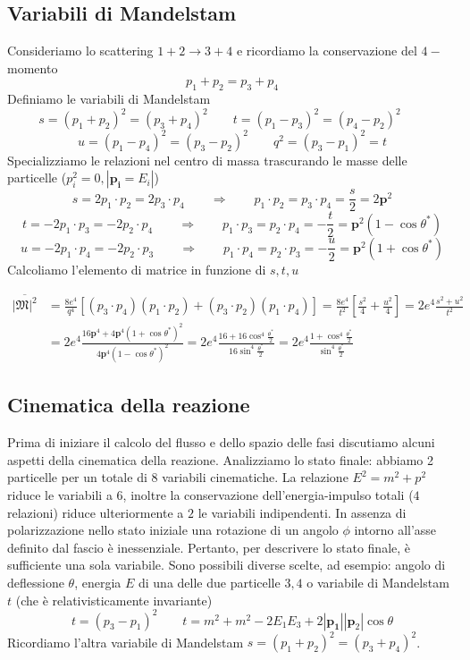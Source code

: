 \subsection{Variabili di Mandelstam}
Consideriamo lo scattering $1+2\to3+4$ e ricordiamo la conservazione del $4-$momento
$$
p_1+p_2=p_3+p_4
$$
Definiamo le variabili di Mandelstam
$$
s = (p_1 + p_2)^2 = (p_3 + p_4)^2 \qquad t = (p_1 - p_3)^2 = (p_4 - p_2)^2 \qquad 
$$
$$
u = (p_1 - p_4)^2 = (p_3 - p_2)^2 \qquad q^2 = (p_3 - p_1)^2 = t
$$
Specializziamo le relazioni nel centro di massa trascurando le masse delle particelle ($p^2_i=0, |\mathbf{p_i}=E_i|$)
$$
s = 2p_1 \cdot p_2 = 2p_3 \cdot p_4 \qquad \Longrightarrow\qquad  p_1 \cdot p_2 = p_3 \cdot p_4 = \frac{s}{2} = 2\mathbf{p}^2
$$
$$
t = -2p_1 \cdot p_3 = -2p_2 \cdot p_4 \qquad \Longrightarrow\qquad p_1 \cdot p_3 = p_2 \cdot p_4 = -\frac{t}{2} = \mathbf{p}^2 (1 - \cos\theta^*)
$$
$$
u = -2p_1 \cdot p_4 = -2p_2 \cdot p_3 \qquad \Longrightarrow\qquad p_1 \cdot p_4 = p_2 \cdot p_3 = -\frac{u}{2} = \mathbf{p}^2 (1 + \cos\theta^*)
$$
Calcoliamo l'elemento di matrice in funzione di $s,t,u$

\begin{align*}
\overline{|\mathfrak{M}|^2} &= \frac{8e^4}{q^4}[(p_3 \cdot p_4)(p_1 \cdot p_2) + (p_3 \cdot p_2)(p_1 \cdot p_4)]= \frac{8e^4}{t^2} \left[ \frac{s^2}{4} + \frac{u^2}{4} \right] = 2e^4 \frac{s^2 + u^2}{t^2}\\
&= 2e^4 \frac{16\mathbf{p}^4 + 4\mathbf{p}^4 (1 + \cos\theta^*)^2}{4\mathbf{p}^4 (1 - \cos\theta^*)^2} = 2e^4 \frac{16 + 16 \cos^4 \frac{\theta^*}{2}}{16 \sin^4 \frac{\theta^*}{2}} = 2e^4 \frac{1 + \cos^4 \frac{\theta^*}{2}}{\sin^4 \frac{\theta^*}{2}}
\end{align*}
\subsection{Cinematica della reazione}
Prima di iniziare il calcolo del flusso e dello spazio delle fasi discutiamo alcuni aspetti della cinematica della reazione. Analizziamo lo stato finale: abbiamo 2 particelle per un totale di $8$ variabili cinematiche. La relazione $E^2=m^2+p^2$ riduce le variabili a $6$, inoltre la conservazione dell'energia-impulso totali ($4$ relazioni) riduce ulteriormente a $2$ le variabili indipendenti. In assenza di polarizzazione nello stato iniziale una rotazione di un angolo $\phi$ intorno all'asse definito dal fascio è inessenziale. Pertanto, per descrivere lo stato finale, è sufficiente una sola variabile. Sono possibili diverse scelte, ad esempio: angolo di deflessione $\theta$, energia $E$ di una delle due particelle $3,4$ o variabile di Mandelstam $t$ (che è relativisticamente invariante)
$$
t=\left(p_3-p_1\right)^2\qquad t=m^2+m^2-2E_1E_3+2|\mathbf{p_1}||\mathbf{p}_2|\cos{\theta}
$$
Ricordiamo l'altra variabile di Mandelstam $s = (p_1 + p_2)^2 = (p_3 + p_4)^2$.
